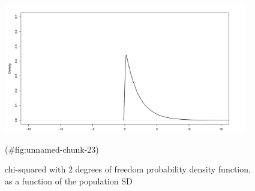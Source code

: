 \begin{appendix}
\begin{figure}
\includegraphics[width=400px]{W-test_files/figure-latex/unnamed-chunk-23-1} \caption{chi-squared with 2 degrees of freedom probability density function, as a function of the population SD}(\#fig:unnamed-chunk-23)
\end{figure}
\end{appendix}

